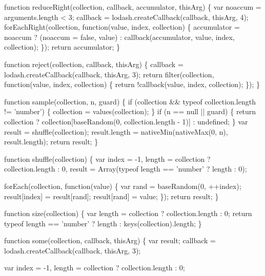 \begin{DoxyCodeInclude}
    \textcolor{keyword}{function} reduceRight(collection, callback, accumulator, thisArg) \{
      var noaccum = arguments.length < 3;
      callback = lodash.createCallback(callback, thisArg, 4);
      forEachRight(collection, \textcolor{keyword}{function}(value, index, collection) \{
        accumulator = noaccum
          ? (noaccum = \textcolor{keyword}{false}, value)
          : callback(accumulator, value, index, collection);
      \});
      \textcolor{keywordflow}{return} accumulator;
    \}

    \textcolor{keyword}{function} reject(collection, callback, thisArg) \{
      callback = lodash.createCallback(callback, thisArg, 3);
      \textcolor{keywordflow}{return} filter(collection, \textcolor{keyword}{function}(value, index, collection) \{
        \textcolor{keywordflow}{return} !callback(value, index, collection);
      \});
    \}

    \textcolor{keyword}{function} sample(collection, n, guard) \{
      \textcolor{keywordflow}{if} (collection && typeof collection.length != \textcolor{stringliteral}{'number'}) \{
        collection = values(collection);
      \}
      \textcolor{keywordflow}{if} (n == null || guard) \{
        \textcolor{keywordflow}{return} collection ? collection[baseRandom(0, collection.length - 1)] : undefined;
      \}
      var result = shuffle(collection);
      result.length = nativeMin(nativeMax(0, n), result.length);
      \textcolor{keywordflow}{return} result;
    \}

    \textcolor{keyword}{function} shuffle(collection) \{
      var index = -1,
          length = collection ? collection.length : 0,
          result = Array(typeof length == \textcolor{stringliteral}{'number'} ? length : 0);

      forEach(collection, \textcolor{keyword}{function}(value) \{
        var rand = baseRandom(0, ++index);
        result[index] = result[rand];
        result[rand] = value;
      \});
      \textcolor{keywordflow}{return} result;
    \}

    \textcolor{keyword}{function} size(collection) \{
      var length = collection ? collection.length : 0;
      \textcolor{keywordflow}{return} typeof length == \textcolor{stringliteral}{'number'} ? length : keys(collection).length;
    \}

    \textcolor{keyword}{function} some(collection, callback, thisArg) \{
      var result;
      callback = lodash.createCallback(callback, thisArg, 3);

      var index = -1,
          length = collection ? collection.length : 0;


\end{DoxyCodeInclude}
